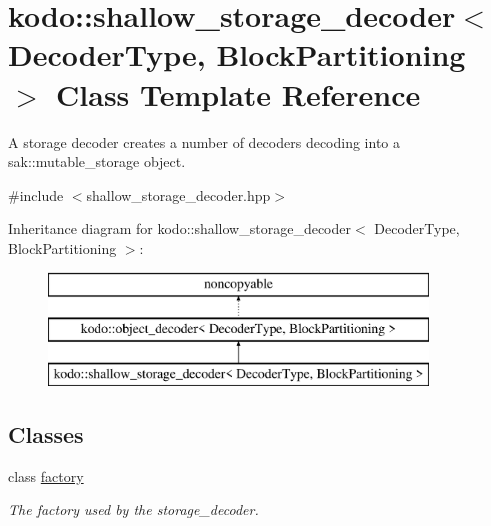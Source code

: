 \hypertarget{classkodo_1_1shallow__storage__decoder}{\section{kodo\-:\-:shallow\-\_\-storage\-\_\-decoder$<$ Decoder\-Type, Block\-Partitioning $>$ Class Template Reference}
\label{classkodo_1_1shallow__storage__decoder}
}


A storage decoder creates a number of decoders decoding into a sak\-::mutable\-\_\-storage object.  




{\ttfamily \#include $<$shallow\-\_\-storage\-\_\-decoder.\-hpp$>$}

Inheritance diagram for kodo\-:\-:shallow\-\_\-storage\-\_\-decoder$<$ Decoder\-Type, Block\-Partitioning $>$\-:\begin{figure}[H]
\begin{center}
\leavevmode
\includegraphics[height=3.000000cm]{classkodo_1_1shallow__storage__decoder}
\end{center}
\end{figure}
\subsection*{Classes}
\begin{DoxyCompactItemize}
\item 
class \hyperlink{classkodo_1_1shallow__storage__decoder_1_1factory}{factory}
\begin{DoxyCompactList}\small\item\em The factory used by the storage\-\_\-decoder. \end{DoxyCompactList}\end{DoxyCompactItemize}
